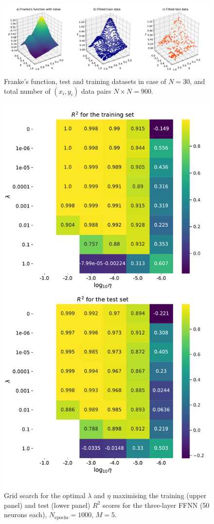 \documentclass{emulateapj}
\begin{document}
\begin{figure}
\label{fig:franke}
\includegraphics[width=1.0\textwidth]{Figures/Franke.pdf}%
\caption{\label{fig:Franke}Franke's function, test and training datasets in case of $N=30$, and total number of $(x_i,y_i)$ data pairs $N\times N=900$.}
\end{figure}

\begin{figure}[h]
    \centering
    \includegraphics[width=.49\textwidth]{Figures/NN_Ridge_R2.pdf}
    \caption{Grid search for the optimal $\lambda$ and $\eta$ maximising the training (upper panel) and test (lower panel) $R^2$ scores for the three-layer FFNN (50 neurons each), $N_{\mathrm{epochs}}=1000$, $M=5$.}
    \label{fig: NN_Ridge_R2}
\end{figure}
\end{document}
